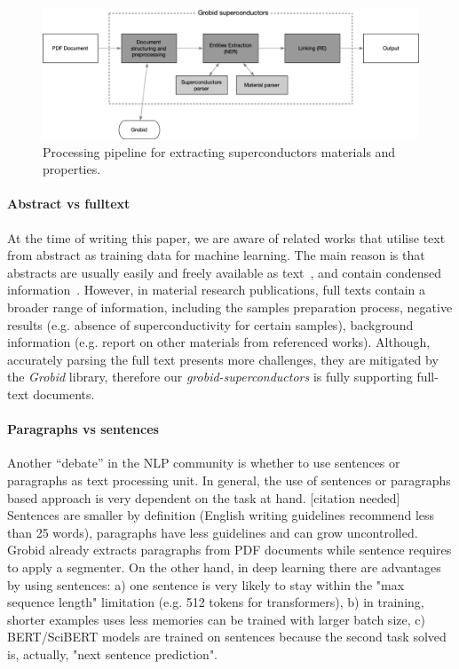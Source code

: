 \documentclass{article}
\begin{document}
\begin{figure}[ht]
\includegraphics[width=\textwidth]{overview-schema-3}
\caption{Processing pipeline for extracting superconductors materials and properties. }
\label{fig:pipeline-overview}
\end{figure}

\paragraph{Abstract vs fulltext}
At the time of writing this paper, we are aware of related works that utilise text from abstract as training data for machine learning. 
The main reason is that abstracts are usually easily and freely available as text~\cite{kononova_text-mined_2019}, and contain condensed information~\cite{yamaguchi-etal-2020-sc, court_magnetic_2020}. 
However, in material research publications, full texts contain a broader range of information, including the samples preparation process, negative results (e.g. absence of superconductivity for certain samples), background information (e.g. report on other materials from referenced works). 
Although, accurately parsing the full text presents more challenges, they are mitigated by the \textit{Grobid} library, therefore our \textit{grobid-superconductors} is fully supporting full-text documents. 

\paragraph{Paragraphs vs sentences}
Another ``debate'' in the NLP community is whether to use sentences or paragraphs as text processing unit. 
In general, the use of sentences or paragraphs based approach is very dependent on the task at hand. [citation needed]
Sentences are smaller by definition (English writing guidelines recommend less than 25 words), paragraphs have less guidelines and can grow uncontrolled.
Grobid already extracts paragraphs from PDF documents while sentence requires to apply a segmenter. 
On the other hand, in deep learning there are advantages by using sentences: a) one sentence is very likely to stay within the "max sequence length" limitation (e.g. 512 tokens for transformers), b) in training, shorter examples uses less memories can be trained with larger batch size, c) BERT/SciBERT models are trained on sentences because the second task solved is, actually, "next sentence prediction".
\end{document}
